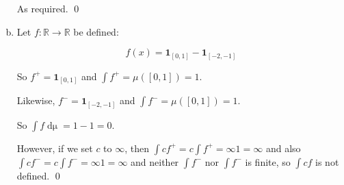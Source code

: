 \documentclass[11pt,oneside]{article}
\numberwithin{equation}{section}
\theoremstyle{definition}
\newtheorem{exercise}{Exercise}
\def\RR{\mathbb{R}}
\def\one{\mathbf{1}}
\begin{document}
\begin{solution}
\begin{enumerate}[(a)]
  As required.  \qed  

  
\item
  Let $f : \RR \to \RR$ be defined:

  \[
  f(x) =  \one_{[0, 1]} - \one_{[-2, -1]}
  \]

  So $f^+ =  \one_{[0, 1]}$ and $\int f^+ = \mu([0,1]) = 1.$

  Likewise, $f^- =  \one_{[-2, -1]}$ and $\int f^- = \mu([0,1]) = 1$.

  So $\int f \mathop{d \mu} = 1 - 1 = 0$.

  However, if we set $c$ to $\infty$, then $ \int c f^+ = c \int f^+ = \infty 1 = \infty$ and
  also  $ \int c f^- = c \int f^- = \infty 1 = \infty$ and neither $\int f^-$ nor $\int f^-$ is finite, so
  $\int c f$ is not defined.  
  \qed
  
\end{enumerate}
\end{solution}


\begin{comment}
\begin{exercise}
  problem
\end{exercise}
\begin{solution}
\begin{enumerate}[(a)]
\item
  first answer
\end{enumerate}
\end{solution}
\end{comment}
\end{document}
